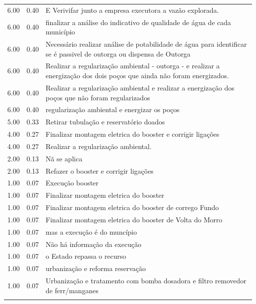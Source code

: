 \documentclass[a4paper, 12pt, openright, oneside, english, brazil, article]{abntex2}
\begin{document}
\begin{scriptsize}
\begin{longtable}{rrp{11cm}}
			6.00 & 0.40 & E Verivifar junto a empresa executora a vazão explorada. \\ 
			6.00 & 0.40 & finalizar a análise do indicativo de qualidade de água de cada município \\ 
			6.00 & 0.40 & Necessário realizar análise de potabilidade de água para identificar se é passivel de outorga ou dispensa de Outorga \\ 
			6.00 & 0.40 & Realizar a regularização ambiental -  outorga -  e realizar a energização dos dois poços que ainda não foram energizados. \\ 
			6.00 & 0.40 & Realizar a regularização ambiental e realizar a energização dos poços que não foram regularizados \\ 
			6.00 & 0.40 & regularização ambiental e energizar os poços \\ 
			5.00 & 0.33 & Retirar tubulação e reservatório doados \\ 
			4.00 & 0.27 & Finalizar montagem eletrica do booster e corrigir ligações \\ 
			4.00 & 0.27 & Realizar a regularização ambiental. \\ 
			2.00 & 0.13 & Nã se aplica \\ 
			2.00 & 0.13 & Refazer o booster e corrigir ligações \\ 
			1.00 & 0.07 & Execução booster \\ 
			1.00 & 0.07 & Finalizar montagem eletrica do booster \\ 
			1.00 & 0.07 & Finalizar montagem eletrica do booster de corrego Fundo \\ 
			1.00 & 0.07 & Finalizar montagem eletrica do booster de Volta do Morro \\ 
			1.00 & 0.07 & mas a execução é do muncípio \\ 
			1.00 & 0.07 & Não há informação da execução \\ 
			1.00 & 0.07 & o Estado repassa o recurso \\ 
			1.00 & 0.07 & urbanização e reforma reservação \\ 
			1.00 & 0.07 & Urbanização e tratamento com bomba dosadora e filtro removedor de ferr/manganes \\ 
			\hline
			\hline
			\label{propostas}
		\end{longtable}
	\end{scriptsize}
	
	
	\newpage
	
\end{document}
